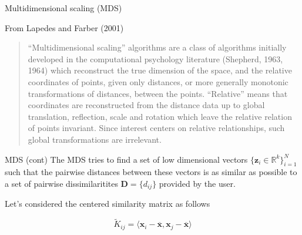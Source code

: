 \documentclass{beamer}
\begin{document}
\begin{frame}{Multidimensional scaling (MDS)}
	
From Lapedes and Farber (2001)
\begin{quote}
	``Multidimensional scaling'' algorithms are a class of algorithms
	initially developed in the computational psychology literature (Shepherd, 1963, 1964) which reconstruct the true dimension of the space, and the
	relative coordinates of points, given only distances, or more generally monotonic transformations of distances, between the points. ``Relative''
	means that coordinates are reconstructed from
	the distance data up to global translation, reflection, scale and rotation which leave the relative
	relation of points invariant. Since interest centers
	on relative relationships, such global transformations are irrelevant.
\end{quote}
	
\end{frame}

\begin{frame}{MDS (cont)}
	The MDS tries to find a set of low dimensional vectors $\{ \textbf{z}_i \in \mathbb{R}^k\}_{i=1}^N$ such that the pairwise distances between these vectors is as similar as possible to a set of pairwise dissimilaritites $\textbf{D}=\{d_{ij}\}$ provided by the user. 

Let's considered the centered similarity matrix as follows

\begin{equation*}
	\tilde{K}_{ij}= \langle \textbf{x}_i - \overline{\textbf{x}}, \textbf{x}_j - \overline{\textbf{x}} \rangle
\end{equation*}
\end{frame}
\end{document}
